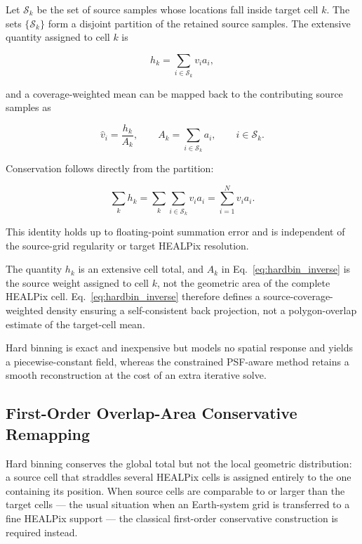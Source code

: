 \documentclass[journal]{IEEEtran}
\newcommand{\healpix}{HEALPix\xspace}
\newcommand{\psf}{PSF\xspace}
\begin{document}
Let $\mathcal S_k$ be the set of source samples whose locations
fall inside target cell $k$. The sets $\{\mathcal S_k\}$ form a
disjoint partition of the retained source samples. The extensive
quantity assigned to cell $k$ is

\begin{equation}
h_k
=
\sum_{i\in\mathcal S_k}v_i a_i,
\label{eq:hardbin_forward}
\end{equation}

and a coverage-weighted mean can be mapped back to the contributing
source samples as

\begin{equation}
\widehat v_i
=
\frac{h_k}{A_k},
\qquad
A_k
=
\sum_{i\in\mathcal S_k}a_i,
\qquad
i\in\mathcal S_k.
\label{eq:hardbin_inverse}
\end{equation}

Conservation follows directly from the partition:

\begin{equation}
\sum_k h_k
=
\sum_k\sum_{i\in\mathcal S_k}v_i a_i
=
\sum_{i=1}^{N}v_i a_i.
\label{eq:hardbin_identity}
\end{equation}

This identity holds up to floating-point summation error and is
independent of the source-grid regularity or target \healpix
resolution.

The quantity $h_k$ is an extensive cell total, and $A_k$ in
Eq.~\eqref{eq:hardbin_inverse} is the source weight assigned to
cell $k$, not the geometric area of the complete \healpix cell.
Eq.~\eqref{eq:hardbin_inverse} therefore defines a
source-coverage-weighted density ensuring a self-consistent back
projection, not a polygon-overlap estimate of the target-cell
mean.

Hard binning is exact and inexpensive but models no spatial
response and yields a piecewise-constant field, whereas the
constrained \psf-aware method retains a smooth reconstruction at
the cost of an extra iterative solve.

\subsection{First-Order Overlap-Area Conservative Remapping}
\label{sec:overlap_conservative}

Hard binning conserves the global total but not the local
geometric distribution: a source cell that straddles several
\healpix cells is assigned entirely to the one containing its
position. When source cells are comparable to or larger than the
target cells --- the usual situation when an Earth-system grid is
transferred to a fine \healpix support --- the classical
first-order conservative construction is required instead.
\end{document}
